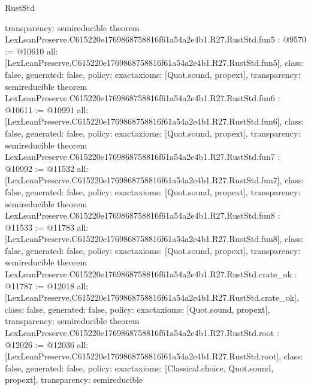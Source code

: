 \begin{lexlean}{RustStd}
\begin{coremodule}
{  transparency: semireducible
}
theorem LexLeanPreserve.C615220e1769868758816f61a54a2e4b1.R27.RustStd.fun5 : @9570 := @10610 {
  all: [LexLeanPreserve.C615220e1769868758816f61a54a2e4b1.R27.RustStd.fun5],
  class: false,
  generated: false,
  policy: exact{axioms: [Quot.sound, propext]},
  transparency: semireducible
}
theorem LexLeanPreserve.C615220e1769868758816f61a54a2e4b1.R27.RustStd.fun6 : @10611 := @10991 {
  all: [LexLeanPreserve.C615220e1769868758816f61a54a2e4b1.R27.RustStd.fun6],
  class: false,
  generated: false,
  policy: exact{axioms: [Quot.sound, propext]},
  transparency: semireducible
}
theorem LexLeanPreserve.C615220e1769868758816f61a54a2e4b1.R27.RustStd.fun7 : @10992 := @11532 {
  all: [LexLeanPreserve.C615220e1769868758816f61a54a2e4b1.R27.RustStd.fun7],
  class: false,
  generated: false,
  policy: exact{axioms: [Quot.sound, propext]},
  transparency: semireducible
}
theorem LexLeanPreserve.C615220e1769868758816f61a54a2e4b1.R27.RustStd.fun8 : @11533 := @11783 {
  all: [LexLeanPreserve.C615220e1769868758816f61a54a2e4b1.R27.RustStd.fun8],
  class: false,
  generated: false,
  policy: exact{axioms: [Quot.sound, propext]},
  transparency: semireducible
}
theorem LexLeanPreserve.C615220e1769868758816f61a54a2e4b1.R27.RustStd.crate_ok : @11787 := @12018 {
  all: [LexLeanPreserve.C615220e1769868758816f61a54a2e4b1.R27.RustStd.crate_ok],
  class: false,
  generated: false,
  policy: exact{axioms: [Quot.sound, propext]},
  transparency: semireducible
}
theorem LexLeanPreserve.C615220e1769868758816f61a54a2e4b1.R27.RustStd.root : @12026 := @12036 {
  all: [LexLeanPreserve.C615220e1769868758816f61a54a2e4b1.R27.RustStd.root],
  class: false,
  generated: false,
  policy: exact{axioms: [Classical.choice, Quot.sound, propext]},
  transparency: semireducible
}


\end{coremodule}
\end{lexlean}
